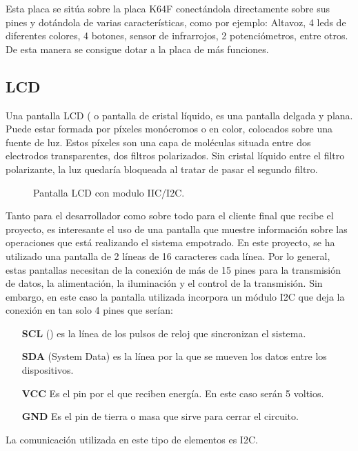 Esta placa se sitúa sobre la placa K64F conectándola directamente sobre sus pines y dotándola de varias características, como por ejemplo:
Altavoz, 4 leds de diferentes colores, 4 botones, sensor de infrarrojos, 2 potenciómetros, entre otros. De esta manera se consigue dotar a la placa de más funciones.

\subsection{LCD}

Una pantalla LCD ( o pantalla de cristal líquido, es una pantalla delgada y plana. Puede estar formada por píxeles monócromos o en color, colocados sobre una fuente de luz. Estos píxeles son una capa de moléculas situada entre dos electrodos transparentes, dos filtros polarizados. Sin cristal líquido entre el filtro polarizante, la luz quedaría bloqueada al tratar de pasar el segundo filtro.

\begin{figure}[!h]
 \centering
 \caption{Pantalla LCD con modulo IIC/I2C.}
 \label{f:animales}
\end{figure}

Tanto para el desarrollador como sobre todo para el cliente final que recibe el proyecto, es interesante el uso de una pantalla que muestre información sobre las operaciones que está realizando el sistema empotrado. En este proyecto, se ha utilizado una pantalla de 2 líneas de 16 caracteres cada línea. Por lo general, estas pantallas necesitan de la conexión de más de 15 pines para la transmisión de datos, la alimentación, la iluminación y el control de la transmisión. Sin embargo, en este caso la pantalla utilizada incorpora un módulo I2C que deja la conexión en tan solo 4 pines que serían:
\begin{itemize}
\item[\textbf{SCL}] () es la línea de los pulsos de reloj que sincronizan el sistema. 
\item[\textbf{SDA}] (System Data) es la línea por la que se mueven los datos entre los dispositivos.
\item[\textbf{VCC}] Es el pin por el que reciben energía. En este caso serán 5 voltios.
\item[\textbf{GND}] Es el pin de tierra o masa que sirve para cerrar el circuito.
\end{itemize}
La comunicación utilizada en este tipo de elementos es I2C.


